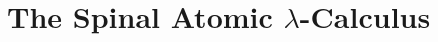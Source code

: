 \documentclass[a4paper,UKenglish,cleveref, autoref]{lipics-v2019}
\newcommand{\lamrule}{\lambda}
\begin{document}
%
%


\section{The Spinal Atomic $\lambda$-Calculus}
\label{chap:salc}
\end{document}
